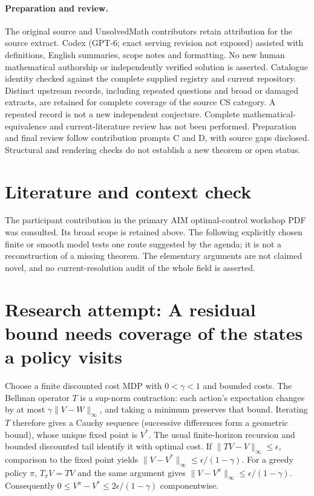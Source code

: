 \documentclass[11pt]{article}
\begin{document}
\paragraph{Preparation and review.}
The original source and UnsolvedMath contributors retain attribution for the source extract. Codex (GPT-6; exact serving revision not exposed) assisted with definitions, English summaries, scope notes and formatting. No new human mathematical authorship or independently verified solution is asserted. Catalogue identity checked against the complete supplied registry and current repository. Distinct upstream records, including repeated questions and broad or damaged extracts, are retained for complete coverage of the source CS category. A repeated record is not a new independent conjecture. Complete mathematical-equivalence and current-literature review has not been performed. Preparation and final review follow contribution prompts C and D, with source gaps disclosed. Structural and rendering checks do not establish a new theorem or open status.
\label{end:statement}

\section{Literature and context check}
The participant contribution in the primary AIM optimal-control workshop
 PDF was consulted. Its broad scope is retained above. The following explicitly
 chosen finite or smooth model tests one route suggested by the agenda; it is
 not a reconstruction of a missing theorem. The elementary arguments are not
 claimed novel, and no current-resolution audit of the whole field is asserted.
\section{Research attempt: A residual bound needs coverage of the states a policy visits}
Choose a finite discounted cost MDP with $0<\gamma<1$ and bounded costs.
The Bellman operator $T$ is a sup-norm contraction: each action's expectation
changes by at most $\gamma\|V-W\|_\infty$, and taking a minimum preserves that
bound. Iterating $T$ therefore gives a Cauchy sequence (successive differences
form a geometric bound), whose unique fixed point is $V^*$. The usual
finite-horizon recursion and bounded discounted tail identify it with optimal cost.
If $\|TV-V\|_\infty\le\epsilon$, comparison to the fixed point yields
$\|V-V^*\|_\infty\le\epsilon/(1-\gamma)$. For a greedy policy $\pi$,
$T_\pi V=TV$ and the same argument gives
$\|V-V^\pi\|_\infty\le\epsilon/(1-\gamma)$.
Consequently $0\le V^\pi-V^*\le2\epsilon/(1-\gamma)$ componentwise.
\end{document}
